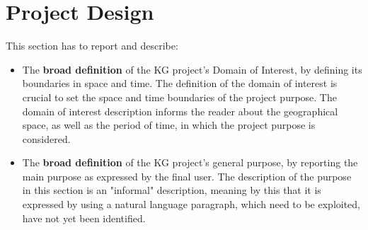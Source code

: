 
\section{Project Design}

This section has to report and describe:
\begin{itemize}
    \item The \textbf{broad definition} of the KG project's Domain of Interest, by defining its boundaries in space and time. The definition of the domain of interest is crucial to set the space and time boundaries of the project purpose. The domain of interest description informs the reader about the geographical space, as well as the period of time, in which the project purpose is considered. 

    \item The \textbf{broad definition} of the KG project's general purpose, by reporting the main purpose as expressed by the final user. The description of the purpose in this section is an "informal" description, meaning by this that it is expressed by using a natural language paragraph, which need to be exploited, have not yet been identified. 

\end{itemize}